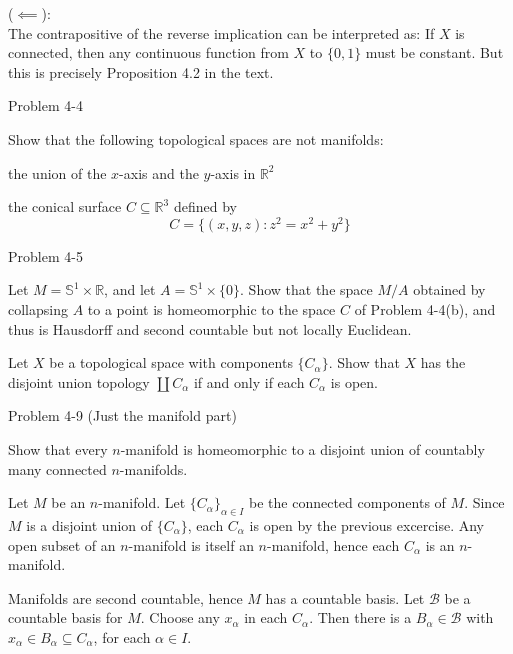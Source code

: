 \documentclass[minion]{homework651}
\newcommand{\nextprob}{\newpage}
\newcommand{\calB}{\mathcal{B}}
\begin{document}
\begin{aproblems}
($\impliedby$):\\
The contrapositive of the reverse implication can be interpreted as:
If $X$ is connected, then any continuous function from $X$ to $\{0,1\}$ must
be constant.  But this is precisely Proposition 4.2 in the text.

\nextprob
\hproblem Problem 4-4

Show that the following topological spaces are not manifolds:

\begin{subproblems}
\item the union of the $x$-axis and the $y$-axis in $\mathbb{R}^2$
\item the conical surface $C\subseteq \mathbb{R}^3$ defined by
\begin{equation*}
C=\{(x,y,z):z^2=x^2+y^2\}
\end{equation*}
\end{subproblems}

\subsol

\subsol

\nextprob
\hproblem Problem 4-5

Let $M=\mathbb{S}^1\times\mathbb{R}$, and let $A=\mathbb{S}^1\times\{0\}$.
Show that the space $M/A$ obtained by collapsing $A$ to a point is homeomorphic
to the space $C$ of Problem 4-4(b), and thus is Hausdorff and second countable
but not locally Euclidean.

\solution

\nextprob
\hproblem Let $X$ be a topological space with components $\{C_\alpha\}$.
Show that $X$ has the disjoint union topology $\coprod C_\alpha$ if and only if
each $C_\alpha$ is open.

\solution

\nextprob
\hproblem Problem 4-9 (Just the manifold part)

Show that every $n$-manifold is homeomorphic to a disjoint union of countably
many connected $n$-manifolds.

\solution
Let $M$ be an $n$-manifold.  Let $\{C_\alpha\}_{\alpha\in I}$
be the connected components of
$M$.  Since $M$ is a disjoint union of $\{C_\alpha\}$, each $C_\alpha$ is
open by the previous excercise.  Any open subset of an $n$-manifold is itself
an $n$-manifold, hence each $C_\alpha$ is an $n$-manifold.

Manifolds are second countable, hence $M$ has a countable basis.  Let $\calB$ be
a countable basis for $M$.  Choose any $x_\alpha$ in each $C_\alpha$.  Then
there is a $B_\alpha\in\calB$ with $x_\alpha\in B_\alpha\subseteq C_\alpha$,
for each $\alpha\in I$.


\end{aproblems}
\end{document}
